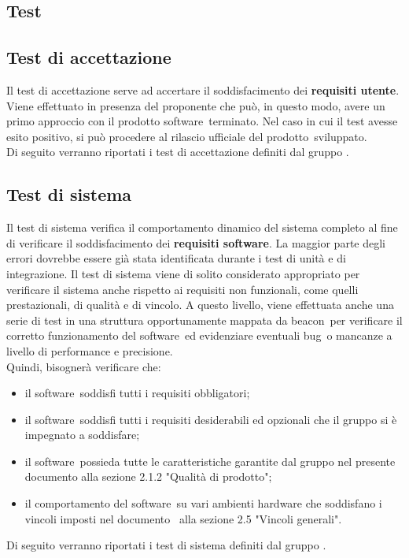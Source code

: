 \documentclass[../PianoDiQualifica.tex]{subfiles}
\begin{document}
\begin{appendices}

\section{Test}
	\subsection{Test di accettazione}
	Il test di accettazione serve ad accertare il soddisfacimento dei \textbf{requisiti utente}. Viene effettuato in presenza del proponente che può, in questo modo, avere un primo approccio con il prodotto software\g\ terminato. Nel caso in cui il test avesse esito positivo, si può procedere al rilascio ufficiale del prodotto\g\ 
sviluppato.\\
	Di seguito verranno riportati i test di accettazione definiti dal gruppo \leaf.
	\subsection{Test di sistema}
	Il test di sistema verifica il comportamento dinamico del sistema completo al fine di verificare il soddisfacimento dei \textbf{requisiti software}. La maggior parte degli errori dovrebbe essere già stata identificata durante i test di unità e di integrazione. Il test di sistema viene di solito considerato appropriato per verificare il sistema anche rispetto ai requisiti non funzionali, come quelli prestazionali, di qualità e di vincolo. A questo livello, viene effettuata anche una serie di test in una struttura opportunamente mappata da beacon\g\ per verificare il corretto funzionamento del software\g\ ed evidenziare eventuali bug\g\ o mancanze a livello di performance e precisione.\\
	Quindi, bisognerà verificare che:
	\begin{itemize}
		\item il software\g\ soddisfi tutti i requisiti obbligatori;
		\item il software\g\ soddisfi tutti i requisiti desiderabili ed opzionali che il gruppo si è impegnato a soddisfare;
		\item il software\g\ possieda tutte le caratteristiche garantite dal gruppo nel presente documento alla sezione 2.1.2 "Qualità di prodotto";
		\item il comportamento del software\g\ su vari ambienti hardware che soddisfano i vincoli imposti nel documento \analisideirequisiti\ alla sezione 2.5 "Vincoli generali".
	\end{itemize}
	Di seguito verranno riportati i test di sistema definiti dal gruppo \leaf.
\end{appendices}
\end{document}
